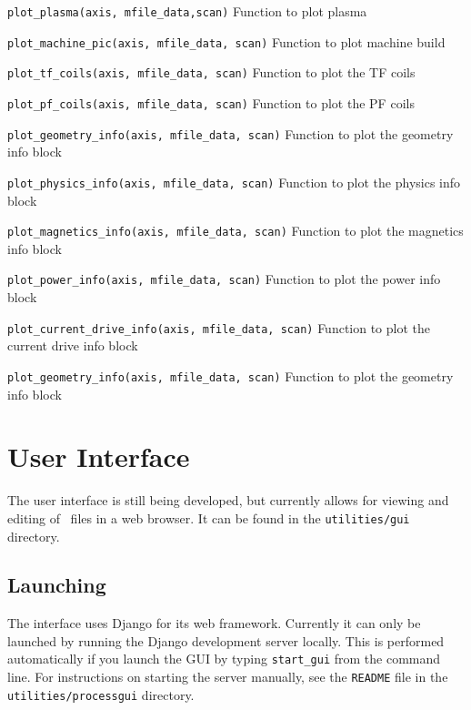 \begin{description}

\item{\verb|plot_plasma(axis, mfile_data,scan)|} Function to plot plasma

\item{\verb|plot_machine_pic(axis, mfile_data, scan)|} Function to plot machine build

\item{\verb|plot_tf_coils(axis, mfile_data, scan)|} Function to plot the TF coils

\item{\verb|plot_pf_coils(axis, mfile_data, scan)|} Function to plot the PF coils

\item{\verb|plot_geometry_info(axis, mfile_data, scan)|} Function to plot the
  geometry info block

\item{\verb|plot_physics_info(axis, mfile_data, scan)|} Function to plot the
  physics info block

\item{\verb|plot_magnetics_info(axis, mfile_data, scan)|} Function to plot the
  magnetics info block

\item{\verb|plot_power_info(axis, mfile_data, scan)|} Function to plot the
  power info block

\item{\verb|plot_current_drive_info(axis, mfile_data, scan)|} Function to plot
  the current drive info block

\item{\verb|plot_geometry_info(axis, mfile_data, scan)|} Function to plot the
  geometry info block

\end{description}



\section{User Interface}
\label{sec:gui}
The user interface is still being developed, but currently allows for viewing
and editing of \indat\ files in a web browser. It can be found in the
\texttt{utilities/gui} directory.

\subsection{Launching}
The interface uses Django for its web framework. Currently it can only be
launched by running the Django development server locally. This is performed
automatically if you launch the GUI by typing \verb+start_gui+ from the
command line. For instructions on starting the server manually, see the
\verb|README| file in the \texttt{utilities/processgui} directory.

